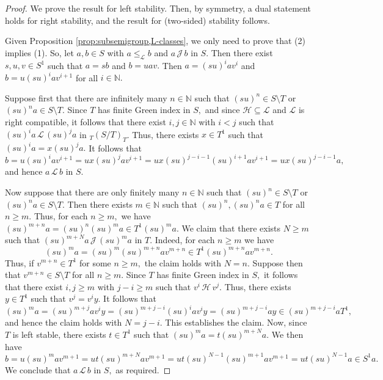 \documentclass[10pt,a4paper]{amsart}
\newcommand{\N}{\mathbb{N}}
\newcommand{\h}{\mbox{${\mathcal{H}}$}}
\newcommand{\leql}{\leq_{\mathcal{L}}}
\newcommand{\sm}{\setminus}
\renewcommand{\j}{\mbox{${\mathcal{J}}$}}
\renewcommand{\l}{\mbox{${\mathcal{L}}$}}
\begin{document}
\begin{proof}
We prove the result for left stability.  Then, by symmetry, a dual statement holds for right stability, and the result for (two-sided) stability follows.   

Given Proposition \ref{prop:subsemigroup,L-classes}, we only need to prove that (2) implies (1).  So, let $a,b\in S$ with $a\leql b$ and $a\,\j\,b$ in $S.$  Then there exist $s,u,v\in S^1$ such that $a=sb$ and $b=uav.$  Then $a=(su)^iav^i$ and $b=u(su)^iav^{i+1}$ for all $i\in\N.$ 

Suppose first that there are infinitely many $n\in\N$ such that $(su)^n\in S{\sm}T$ or $(su)^na\in S{\sm}T.$  Since $T$ has finite Green index in $S,$ and since $\h\subseteq\l$ and $\l$ is right compatible, it follows that there exist $i,j\in\N$ with $i<j$ such that $(su)^ia\,\l\,(su)^ja$ in ${_T}(S/T)_T$.  Thus, there exists $x\in T^1$ such that $(su)^ia=x(su)^ja.$  It follows that
$$b=u(su)^iav^{i+1}=ux(su)^jav^{i+1}=ux(su)^{j-i-1}(su)^{i+1}av^{i+1}=ux(su)^{j-i-1}a,$$
and hence $a\,\l\,b$ in $S.$

Now suppose that there are only finitely many $n\in\N$ such that $(su)^n\in S{\sm}T$ or $(su)^na\in S{\sm}T.$  Then there exists $m\in\N$ such that $(su)^n,(su)^na\in T$ for all $n\geq m.$  Thus, for each $n\geq m,$ we have $(su)^{m+n}a=(su)^n(su)^ma\in T^1(su)^ma.$  We claim that there exists $N\geq m$ such that $(su)^{m+N}a\,\j\,(su)^ma$ in $T.$  Indeed, for each $n\geq m$ we have 
$$(su)^ma=(su)^m(su)^{m+n}av^{m+n}\in T^1(su)^{m+n}av^{m+n}.$$  
Thus, if $v^{m+n}\in T^1$ for some $n\geq m,$ the claim holds with $N=n.$  Suppose then that $v^{m+n}\in S{\sm}T$ for all $n\geq m.$  Since $T$ has finite Green index in $S,$ it follows that there exist $i,j\geq m$ with $j-i\geq m$ such that $v^i\,\h\,v^j$.  Thus, there exists $y\in T^1$ such that $v^j=v^iy.$  It follows that
$$(su)^ma=(su)^{m+j}av^iy
=(su)^{m+j-i}(su)^iav^iy=(su)^{m+j-i}ay\in(su)^{m+j-i}aT^1,$$
and hence the claim holds with $N=j-i.$  This establishes the claim.  Now, since $T$ is left stable, there exists $t\in T^1$ such that $(su)^ma=t(su)^{m+N}a.$  We then have
$$b=u(su)^mav^{m+1}=ut(su)^{m+N}av^{m+1}
=ut(su)^{N-1}(su)^{m+1}av^{m+1}=ut(su)^{N-1}a\in S^1a.$$
We conclude that $a\,\l\,b$ in $S,$ as required.
\end{proof}
\end{document}

